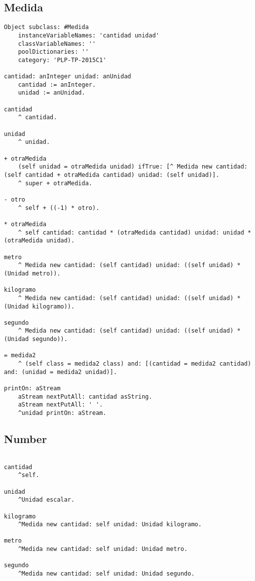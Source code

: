 \subsection{Medida}
\begin{lstlisting}
Object subclass: #Medida
	instanceVariableNames: 'cantidad unidad'
	classVariableNames: ''
	poolDictionaries: ''
	category: 'PLP-TP-2015C1'

cantidad: anInteger unidad: anUnidad
	cantidad := anInteger.
	unidad := anUnidad.

cantidad
	^ cantidad.

unidad
	^ unidad.

+ otraMedida
	(self unidad = otraMedida unidad) ifTrue: [^ Medida new cantidad: (self cantidad + otraMedida cantidad) unidad: (self unidad)].
	^ super + otraMedida.

- otro 
	^ self + ((-1) * otro).

* otraMedida 
	^ self cantidad: cantidad * (otraMedida cantidad) unidad: unidad * (otraMedida unidad).

metro
	^ Medida new cantidad: (self cantidad) unidad: ((self unidad) * (Unidad metro)).

kilogramo
	^ Medida new cantidad: (self cantidad) unidad: ((self unidad) * (Unidad kilogramo)).

segundo
	^ Medida new cantidad: (self cantidad) unidad: ((self unidad) * (Unidad segundo)).

= medida2
	^ (self class = medida2 class) and: [(cantidad = medida2 cantidad) and: (unidad = medida2 unidad)].

printOn: aStream
	aStream nextPutAll: cantidad asString. 
	aStream nextPutAll: ' '. 
	^unidad printOn: aStream.

\end{lstlisting}
\vspace{5mm}

\subsection{Number}
\begin{lstlisting}

cantidad
	^self.

unidad
	^Unidad escalar.

kilogramo
	^Medida new cantidad: self unidad: Unidad kilogramo.

metro
	^Medida new cantidad: self unidad: Unidad metro.
	
segundo
	^Medida new cantidad: self unidad: Unidad segundo.

\end{lstlisting}